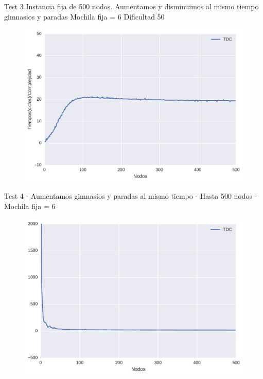 Test 3
Instancia fija de 500 nodos.
Aumentamos y disminuimos al mismo tiempo gimnasios y paradas
Mochila fija = 6
Dificultad 50

\begin{figure}[H]
  \begin{center}
    \includegraphics[scale=0.8]{imagenes/ej2test3iempos.pdf}
    \caption{}
    \label{}
  \end{center}
\end{figure}


Test 4 - 
Aumentamos gimnasios y paradas al mismo tiempo - 
Hasta 500 nodos - 
Mochila fija = 6


\begin{figure}[H]
  \begin{center}
    \includegraphics[scale=0.8]{imagenes/ej2test4iempos.pdf}
    \caption{}
    \label{}
  \end{center}
\end{figure}


